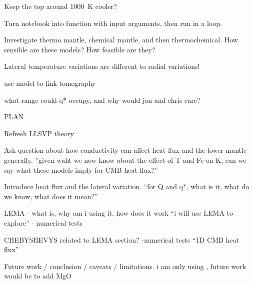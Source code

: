 Keep the top around 1000~K cooler?

Turn notebook into function with input arguments, then run in a loop.

Investigate thermo mantle, chemical mantle, and then thermochemical. How sensible are these models? How feasible are they?

Lateral temperature variations are different to radial variations!

use model to link tomography

what range could q* occupy, and why would jon and chris care?




PLAN

Refresh LLSVP theory

Ask question about how conductivity can affect heat flux and the lower mantle generally. ''given waht we now know about the effect of T and Fe on K, can we say what these models imply for CMB heat flux?''

Introduce heat flux and the lateral variation. ``for Q and q*, what is it, what do we know, what does it mean?'' 

LEMA - what is, why am i using it, how does it work ``i will use LEMA to explore'' - numerical tests

CHEBYSHEVYS related to LEMA section? -numerical tests ``1D CMB heat flux''

Future work / conclusion / caveats / limitations. i am only using \bdg, future work would be to add MgO















